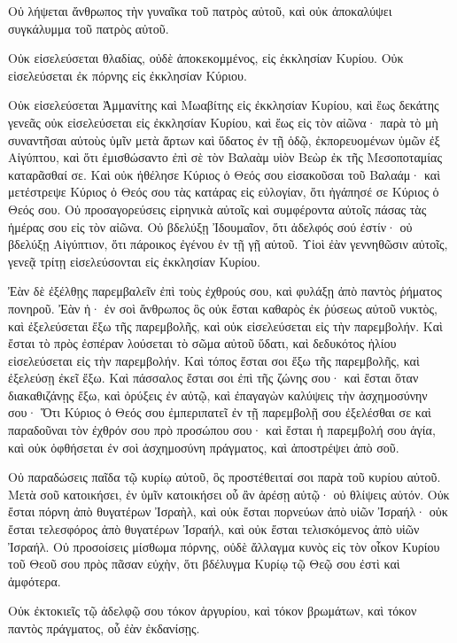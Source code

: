 {Οὐ λήψεται ἄνθρωπος τὴν γυναῖκα τοῦ πατρὸς αὐτοῦ, καὶ οὐκ ἀποκαλύψει συγκάλυμμα τοῦ πατρὸς αὐτοῦ.
\par }{\PP {}Οὐκ εἰσελεύσεται θλαδίας, οὐδὲ ἀποκεκομμένος, εἰς ἐκκλησίαν Κυρίου.
Οὐκ εἰσελεύσεται ἐκ πόρνης εἰς ἐκκλησίαν Κύριου.
\par }{\PP {}Οὐκ εἰσελεύσεται Ἀμμανίτης καὶ Μωαβίτης εἰς ἐκκλησίαν Κυρίου, καὶ ἕως δεκάτης γενεᾶς οὐκ εἰσελεύσεται εἰς ἐκκλησίαν Κυρίου, καὶ ἕως εἰς τὸν αἰῶνα·
παρὰ τὸ μὴ συναντῆσαι αὐτοὺς ὑμῖν μετὰ ἄρτων καὶ ὕδατος ἐν τῇ ὁδῷ, ἐκπορευομένων ὑμῶν ἐξ Αἰγύπτου, καὶ ὅτι ἐμισθώσαντο ἐπὶ σὲ τὸν Βαλαὰμ υἱὸν Βεὼρ ἐκ τῆς Μεσοποταμίας καταρᾶσθαί σε.
Καὶ οὐκ ἠθέλησε Κύριος ὁ Θεός σου εἰσακοῦσαι τοῦ Βαλαάμ· καὶ μετέστρεψε Κύριος ὁ Θεός σου τὰς κατάρας εἰς εὐλογίαν, ὅτι ἠγάπησέ σε Κύριος ὁ Θεός σου.
Οὐ προσαγορεύσεις εἰρηνικὰ αὐτοῖς καὶ συμφέροντα αὐτοῖς πάσας τὰς ἡμέρας σου εἰς τὸν αἰῶνα.
Οὐ βδελύξῃ Ἰδουμαῖον, ὅτι ἀδελφός σού ἐστίν· οὐ βδελύξῃ Αἰγύπτιον, ὅτι πάροικος ἐγένου ἐν τῇ γῇ αὐτοῦ.
Υἱοὶ ἐὰν γεννηθῶσιν αὐτοῖς, γενεᾷ τρίτῃ εἰσελεύσονται εἰς ἐκκλησίαν Κυρίου.
\par }{\PP {}Ἐὰν δὲ ἐξέλθῃς παρεμβαλεῖν ἐπὶ τοὺς ἐχθρούς σου, καὶ φυλάξῃ ἀπὸ παντὸς ῥήματος πονηροῦ.
Ἐὰν ἠ· ἐν σοὶ ἄνθρωπος ὃς οὐκ ἔσται καθαρὸς ἐκ ῥύσεως αὐτοῦ νυκτὸς, καὶ ἐξελεύσεται ἔξω τῆς παρεμβολῆς, καὶ οὐκ εἰσελεύσεται εἰς τὴν παρεμβολήν.
Καὶ ἔσται τὸ πρὸς ἐσπέραν λούσεται τὸ σῶμα αὐτοῦ ὕδατι, καὶ δεδυκότος ἡλίου εἰσελεύσεται εἰς τὴν παρεμβολήν.
Καὶ τόπος ἔσται σοι ἔξω τῆς παρεμβολῆς, καὶ ἐξελεύσῃ ἐκεῖ ἔξω.
Καὶ πάσσαλος ἔσται σοι ἐπὶ τῆς ζώνης σου· καὶ ἔσται ὅταν διακαθιζάνῃς ἔξω, καὶ ὀρύξεις ἐν αὐτῷ, καὶ ἐπαγαγὼν καλύψεις τὴν ἀσχημοσύνην σου·
Ὅτι Κύριος ὁ Θεός σου ἐμπεριπατεῖ ἐν τῇ παρεμβολῇ σου ἐξελέσθαι σε καὶ παραδοῦναι τὸν ἐχθρόν σου πρὸ προσώπου σου· καὶ ἔσται ἡ παρεμβολή σου ἁγία, καὶ οὐκ ὀφθήσεται ἐν σοὶ ἀσχημοσύνη πράγματος, καὶ ἀποστρέψει ἀπὸ σοῦ.
\par }{\PP {}Οὐ παραδώσεις παῖδα τῷ κυρίῳ αὐτοῦ, ὃς προστέθειταί σοι παρὰ τοῦ κυρίου αὐτοῦ.
Μετὰ σοῦ κατοικήσει, ἐν ὑμῖν κατοικήσει οὗ ἂν ἀρέσῃ αὐτῷ· οὐ θλίψεις αὐτόν.
Οὐκ ἔσται πόρνη ἀπὸ θυγατέρων Ἰσραὴλ, καὶ οὐκ ἔσται πορνεύων ἀπὸ υἱῶν Ἰσραήλ· οὐκ ἔσται τελεσφόρος ἀπὸ θυγατέρων Ἰσραήλ, καὶ οὐκ ἔσται τελισκόμενος ἀπὸ υἱῶν Ἰσραήλ.
Οὐ προσοίσεις μίσθωμα πόρνης, οὐδὲ ἄλλαγμα κυνὸς εἰς τὸν οἶκον Κυρίου τοῦ Θεοῦ σου πρὸς πᾶσαν εὐχὴν, ὅτι βδέλυγμα Κυρίῳ τῷ Θεῷ σου ἐστὶ καὶ ἀμφότερα.
\par }{\PP {}Οὐκ ἐκτοκιεῖς τῷ ἀδελφῷ σου τόκον ἀργυρίου, καὶ τόκον βρωμάτων, καὶ τόκον παντὸς πράγματος, οὗ ἐὰν ἐκδανίσῃς.
}
